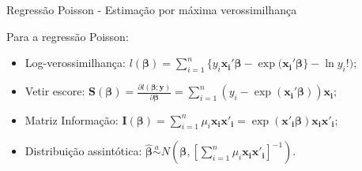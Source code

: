 \documentclass[10pt, aspectratio=169]{beamer}
\begin{document}
\begin{frame}{Regressão Poisson - Estimação por máxima verossimilhança} 

Para a regressão Poisson:

\vspace{0.5cm}

\begin{itemize} 

\item Log-verossimilhança: $l(\boldsymbol{\beta})=\sum_{i=1}^{n} \{ y_{i}\boldsymbol{x_{i}'\beta}-\exp{(\boldsymbol{x_{i}'\beta}}\}-\ln{y_{i}!});$

\vspace{0.5cm}

\item Vetir escore: $\boldsymbol{S}(\boldsymbol{\beta})=\frac{\partial l(\boldsymbol{\beta};\boldsymbol{y})}{\partial \boldsymbol{\beta}}=
              \sum_{i=1}^{n}(y_{i}-\exp(\boldsymbol{x_{i}'\beta}))\boldsymbol{x_{i}};$       
\vspace{0.5cm}
  
\item Matriz Informação: $
\boldsymbol{I({\beta})} = \sum_{i=1}^n \mu_i \boldsymbol{x_i x'_i}  = \exp{(\boldsymbol{x'_i \beta})\boldsymbol{x_i x'_i}}; 
$
  
\vspace{0.5cm}
  
\item  Distribuição assintótica: $
\boldsymbol{\hat{\beta}} \overset{a}{\sim} N \left ( \boldsymbol{\beta}, \left [ \sum_{i=1}^n \mu_i \boldsymbol{x_i x'_i} \right ]^{-1} \right ). 
$ 
       
\end{itemize}

\end{frame}




\end{document}
